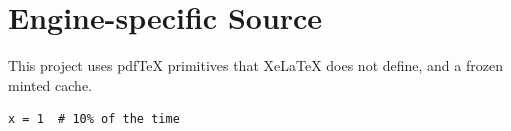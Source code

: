 \documentclass{article}
\begin{document}
\section{Engine-specific Source}
This project uses pdfTeX primitives that XeLaTeX does not define, and a frozen minted cache.
\begin{verbatim}
x = 1  # 10% of the time
\end{verbatim}
\end{document}
